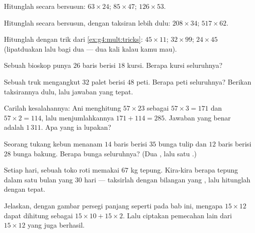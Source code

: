 \begin{exercise}[$\star$]\label{exo:g4:mult:3}
Hitunglah secara bersusun: $63 \times 24$; \quad $85 \times 47$; \quad
$126 \times 53$.
\end{exercise}

\begin{exercise}[$\star$]\label{exo:g4:mult:4}
Hitunglah secara bersusun, dengan taksiran lebih dulu: $208 \times 34$;
\quad $517 \times 62$.
\end{exercise}

\begin{exercise}[$\star$]\label{exo:g4:mult:5}
Hitunglah dengan trik dari \cref{ex:g4:mult:tricks}:
$45 \times 11$; \quad $32 \times 99$; \quad $24 \times 45$
(lipatduakan lalu bagi dua --- dua kali kalau kamu mau).
\end{exercise}

\begin{exercise}[$\star$]\label{exo:g4:mult:6}
Sebuah bioskop punya $26$ baris berisi $18$ kursi. Berapa kursi seluruhnya?
\end{exercise}

\begin{exercise}[$\star$]\label{exo:g4:mult:7}
Sebuah truk mengangkut $32$ palet berisi $48$ peti. Berapa peti
seluruhnya? Berikan taksirannya dulu, lalu jawaban yang tepat.
\end{exercise}

\begin{exercise}[$\star$]\label{exo:g4:mult:8}
Carilah kesalahannya: Ani menghitung $57 \times 23$ sebagai
$57 \times 3 = 171$ dan $57 \times 2 = 114$, lalu menjumlahkannya
$171 + 114 = 285$. Jawaban yang benar adalah $1\,311$. Apa yang ia
lupakan?
\end{exercise}

\begin{exercise}[$\star\star$]\label{exo:g4:mult:9}
Seorang tukang kebun menanam $14$ baris berisi $35$ bunga tulip dan
$12$ baris berisi $28$ bunga bakung. Berapa bunga seluruhnya? (Dua , lalu satu .)
\end{exercise}

\begin{exercise}[$\star\star$]\label{exo:g4:mult:10}
Setiap hari, sebuah toko roti memakai $67$ kg tepung. Kira-kira
berapa tepung dalam satu bulan yang $30$ hari --- taksirlah dengan
bilangan yang , lalu hitunglah dengan tepat.
\end{exercise}

\begin{exercise}[$\star\star$]\label{exo:g4:mult:11}
Jelaskan, dengan gambar persegi panjang seperti pada bab ini,
mengapa $15 \times 12$ dapat dihitung sebagai
$15 \times 10 + 15 \times 2$. Lalu ciptakan pemecahan lain dari
$15 \times 12$ yang juga berhasil.

\end{exercise}
